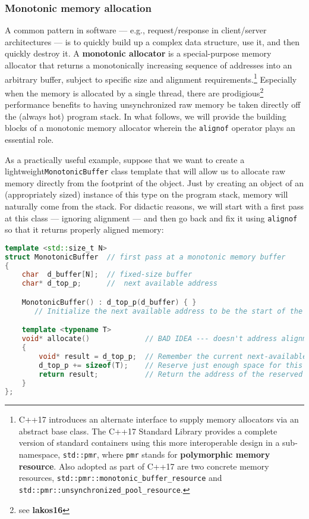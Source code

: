 \subsubsection[Monotonic memory allocation]{Monotonic memory allocation}\label{monotonic-memory-allocation}

A common pattern in software --- e.g., request/response in client/server
architectures --- is to quickly build up a complex data structure,
use it, and then quickly destroy it. A \textbf{monotonic allocator} is
a special-purpose memory allocator that returns a monotonically
increasing sequence of addresses into an arbitrary buffer, subject to
specific size and alignment requirements.{\cprotect\footnote{C++17
introduces an alternate interface to supply memory allocators via an
abstract base class. The C++17 Standard Library provides a complete
version of standard containers using this more interoperable design in
a sub-namespace, \texttt{std::pmr}, where \texttt{pmr} stands for
\textbf{polymorphic memory resource}. Also adopted as part of C++17
are two concrete memory resources,
\texttt{std::pmr::monotonic\_buffer\_resource} and
  \texttt{std::pmr::unsynchronized\_pool\_resource}.}} Especially when
the memory is allocated by a single thread, there are prodigious\footnote{see
\textbf{lakos16}} performance benefits to having unsynchronized raw
memory be taken directly off the (always hot) program stack. In what
follows, we will provide the building blocks of a monotonic memory
allocator wherein the \texttt{alignof} operator plays an essential role.

As a practically useful example, suppose that we want to create a
lightweight\linebreak[4] \mbox{\texttt{MonotonicBuffer}} class template that will allow us
to allocate raw memory directly from the footprint of the object. Just
by creating an object of an (appropriately sized) instance of this type
on the program stack, memory will naturally come from the stack. For
didactic reasons, we will start with a first pass at this class ---
ignoring alignment --- and then go back and fix it using
\texttt{alignof} so that it returns properly aligned memory:

\begin{lstlisting}[language=C++]
template <std::size_t N>
struct MonotonicBuffer  // first pass at a monotonic memory buffer
{
    char  d_buffer[N];  // fixed-size buffer
    char* d_top_p;      //  next available address

    MonotonicBuffer() : d_top_p(d_buffer) { }
       // Initialize the next available address to be the start of the buffer.

    template <typename T>
    void* allocate()             // BAD IDEA --- doesn't address alignment
    {
        void* result = d_top_p;  // Remember the current next-available address.
        d_top_p += sizeof(T);    // Reserve just enough space for this type.
        return result;           // Return the address of the reserved space.
    }
};
\end{lstlisting}

